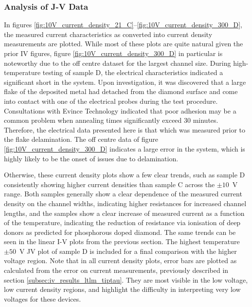 \begin{refsection}
\subsubsection{Analysis of J-V Data}
In figures \ref{fig:10V_current_density_21_C}--\ref{fig:10V_current_density_300_D}, the measured current characteristics as converted into current density measurements are plotted. While most of these plots are quite natural given the prior IV figures, figure \ref{fig:10V_current_density_300_D} in particular is noteworthy due to the off centre dataset for the largest channel size. During high-temperature testing of sample D, the electrical characteristics indicated a significant short in the system. Upon investigation, it was discovered that a large flake of the deposited metal had detached from the diamond surface and come into contact with one of the electrical probes during the test procedure. Consultations with Evince Technology indicated that poor adhesion may be a common problem when annealing times significantly exceed 30 minutes. Therefore, the electrical data presented here is that which was measured prior to the flake delamination. The off centre data of figure \ref{fig:10V_current_density_300_D} indicates a large error in the system, which is highly likely to be the onset of issues due to delamination. 

Otherwise, these current density plots show a few clear trends, such as sample D consistently showing higher current densities than sample C across the $\pm10$~\si{\volt} range. Both samples generally show a clear dependence of the measured current density on the channel widths, indicating higher resistances for increased channel lengths, and the samples show a clear increase of measured current as a function of the temperature, indicating the reduction of resistance via ionisation of deep donors as predicted for phosphorous doped diamond. The same trends can be seen in the linear I-V plots from the previous section. The highest temperature $\pm50$~\si{\volt} JV plot of sample D is included for a final comparison with the higher voltage region. Note that in all current density plots, error bars are plotted as calculated from the error on current measurements, previously described in section \ref{subsec:iv_results_ltlm_tiptau}. They are most visible in the low voltage, low current density regions, and highlight the difficulty in interpreting very low voltages for these devices.


\end{refsection}
